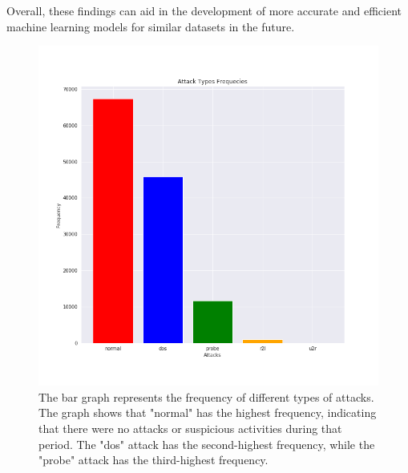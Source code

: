 \documentclass{article}
\begin{document}
Overall, these findings can aid in the development of more accurate and efficient machine learning models for similar datasets in the future.




\begin{figure}[htbp]
\centering
\includegraphics[scale=0.5]{figures/attack_types_frequencies.png}
\caption{The bar graph represents the frequency of different types of attacks. The graph shows that "normal" has the highest frequency, indicating that there were no attacks or suspicious activities during that period. The "dos" attack has the second-highest frequency, while the "probe" attack has the third-highest frequency.}
\label{fig:attack_types_frequencies}
\end{figure}
\end{document}
